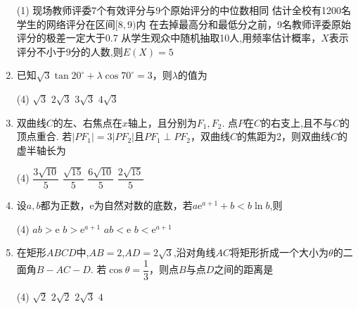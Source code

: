 \documentclass[11pt]{article}
\begin{document}
\begin{enumerate}
	\begin{tasks}(1)
		\task 现场教师评委7个有效评分与9个原始评分的中位数相同
		\task 估计全校有1200名学生的网络评分在区间$ [8,9) $内
		\task 在去掉最高分和最低分之前，9名教师评委原始评分的极差一定大于0.7
		\task 从学生观众中随机抽取10人,用频率估计概率，$ X $表示评分不小于9分的人数,则$ E(X)=5 $
	\end{tasks}

	\item 已知$ \sqrt{3}\tan 20^\circ +\lambda \cos 70^\circ = 3$，则$\lambda $的值为
	\begin{tasks}(4)
		\task $\sqrt{3} $
		\task $ 2\sqrt{3}$
		\task $3\sqrt{3}$
		\task $4\sqrt{3}$
	\end{tasks}	
	
	
	
	\item 双曲线$ C $的左、右焦点在$ x $轴上，且分别为$ F_1,F_2 $. 点$ P $在$ C $的右支上,且不与$ C $的顶点重合. 若$ \left |PF_1 \right |=3\left | PF_2 \right |  $且$ PF_1 \perp PF_2 $，双曲线$C$的焦距为2，则双曲线$C$的虚半轴长为
	\begin{tasks}(4)
		\task $ \dfrac{3\sqrt{10}}{5} $
		\task $ \dfrac{\sqrt{15}}{5} $
		\task $ \dfrac{6\sqrt{10}}{5} $
		\task $ \dfrac{2\sqrt{15}}{5} $
	\end{tasks}	
	\item 设$ a,b $都为正数，$ \mathrm{e} $为自然对数的底数，若$ a\mathrm{e}^{a+1}+b<b\ln b $,则
	\begin{tasks}(4)
		\task $ ab>\mathrm{e} $
		\task $ b>\mathrm{e}^{a+1} $
		\task $ ab<\mathrm{e} $
		\task $ b<\mathrm{e}^{a+1} $
	\end{tasks}

	\item 在矩形$ ABCD  $中,$ AB=2 $,$ AD=2\sqrt{3} $,沿对角线$ AC $将矩形折成一个大小为$ \theta $的二面角$ B-AC-D $. 若$ \cos \theta = \dfrac{1}{3} $，则点$B$与点$D$之间的距离是
	\begin{tasks}(4)
		\task $ \sqrt{2} $
		\task $ 2\sqrt{2} $
		\task $ 2\sqrt{3} $
		\task $ 4 $
	\end{tasks}
\end{enumerate}
\end{document}
